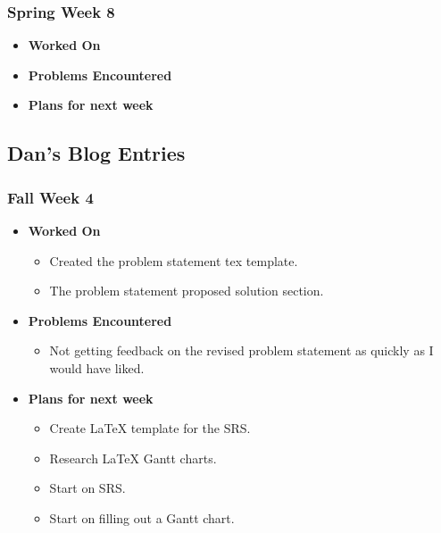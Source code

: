 \documentclass[compsoc,draftclsnofoot,onecolumn,10pt]{IEEEtran}
\begin{document}
\subsubsection{Spring Week 8}
\begin{itemize}
    \item {\textbf{Worked On}}
    \begin{itemize}
        
    \end{itemize}

    \item {\textbf{Problems Encountered}}
    \begin{itemize}
        
    \end{itemize}

    \item{\textbf{Plans for next week}}
    \begin{itemize}
        
    \end{itemize}

\end{itemize}

\subsection{Dan's Blog Entries}

\subsubsection{Fall Week 4}
\begin{itemize}
    \item {\textbf{Worked On}}
    \begin{itemize}
        \item Created the problem statement tex template.
        \item The problem statement proposed solution section.        
    \end{itemize}

    \item {\textbf{Problems Encountered}}
    \begin{itemize}
        \item Not getting feedback on the revised problem statement as quickly as I would have liked.
    \end{itemize}
    \item{\textbf{Plans for next week}}
    \begin{itemize}
        \item Create LaTeX template for the SRS.
        \item Research LaTeX Gantt charts.
        \item Start on SRS.
        \item Start on filling out a Gantt chart.        
    \end{itemize}


\end{itemize}
\end{document}
